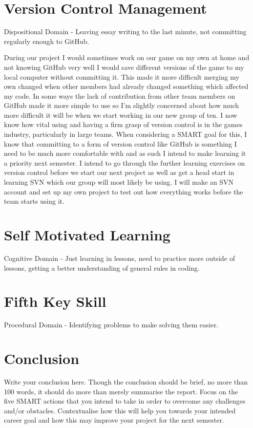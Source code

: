 \documentclass{scrartcl}
\begin{document}
\section{Version Control Management}

Dispositional Domain - Leaving essay writing to the last minute, not committing regularly enough to GitHub.

During our project I would sometimes work on our game on my own at home and not knowing GitHub very well I would save different versions of the game to my local computer without committing it. This made it more difficult merging my own changed when other members had already changed something which affected my code. In some ways the lack of contribution from other team members on GitHub made it more simple to use so I'm slightly concerned about how much more difficult it will be when we start working in our new group of ten. I now know how vital using and having a firm grasp of version control is in the games industry, particularly in large teams. When considering a SMART goal for this, I know that committing to a form of version control like GitHub is something I need to be much more comfortable with and as such I intend to make learning it a priority next semester. I intend to go through the further learning exercises on version control before we start our next project as well as get a head start in learning SVN which our group will most likely be using. I will make an SVN account and set up my own project to test out how everything works before the team starts using it.

\section{Self Motivated Learning}

Cognitive Domain - Just learning in lessons, need to practice more outside of lessons, getting a better understanding of general rules in coding.



\section{Fifth Key Skill}

Procedural Domain - Identifying problems to make solving them easier.

\section{Conclusion}

Write your conclusion here. Though the conclusion should be brief, no more than 100 words, it should do more than merely summarise the report. Focus on the five SMART actions that you intend to take in order to overcome any challenges and/or obstacles. Contextualise how this will help you towards your intended career goal and how this may improve your project for the next semester.



\end{document}
